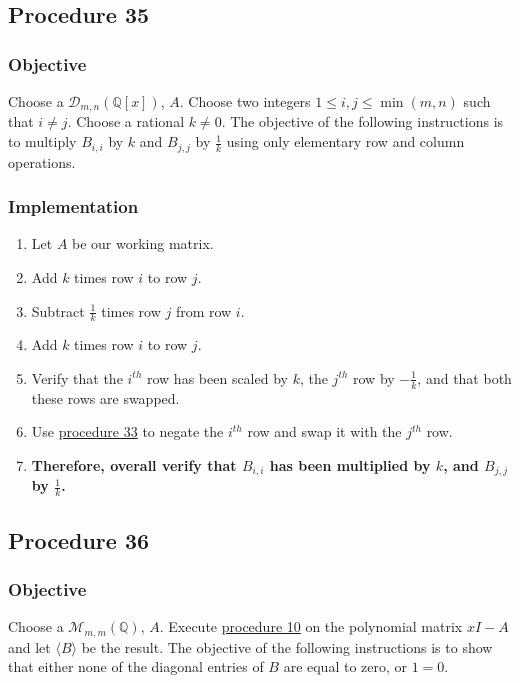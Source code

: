 \documentclass[twocolumn]{article}
\begin{document}
		\subsection{Procedure 35}\label{sec:procedure 35}
			\subsubsection{Objective}
				Choose a $\mathcal{D}_{m,n}(\mathbb{Q}[x])$, $A$. Choose two integers $1\le i,j\le\min(m,n)$ such that $i\ne j$. Choose a rational $k\ne 0$. The objective of the following instructions is to multiply $B_{i,i}$ by $k$ and $B_{j,j}$ by $\frac{1}{k}$ using only elementary row and column operations.
			\subsubsection{Implementation}
				\begin{enumerate}
					\item Let $A$ be our working matrix.
					\item Add $k$ times row $i$ to row $j$.
					\item Subtract $\frac{1}{k}$ times row $j$ from row $i$.
					\item Add $k$ times row $i$ to row $j$.
					\item Verify that the $i^{th}$ row has been scaled by $k$, the $j^{th}$ row by $-\frac{1}{k}$, and that both these rows are swapped.
					\item Use \hyperref[sec:procedure 33]{procedure 33} to negate the $i^{th}$ row and swap it with the $j^{th}$ row.
					\item \textbf{Therefore, overall verify that $B_{i,i}$ has been multiplied by $k$, and $B_{j,j}$ by $\frac{1}{k}$.}
				\end{enumerate}
		\subsection{Procedure 36}\label{sec:procedure 36}
			\subsubsection{Objective}
				Choose a $\mathcal{M}_{m,m}(\mathbb{Q})$, $A$. Execute \hyperref[sec:procedure 10]{procedure 10} on the polynomial matrix $xI-A$ and let $\langle B\rangle$ be the result. The objective of the following instructions is to show that either none of the diagonal entries of $B$ are equal to zero, or $1=0$.
\end{document}
